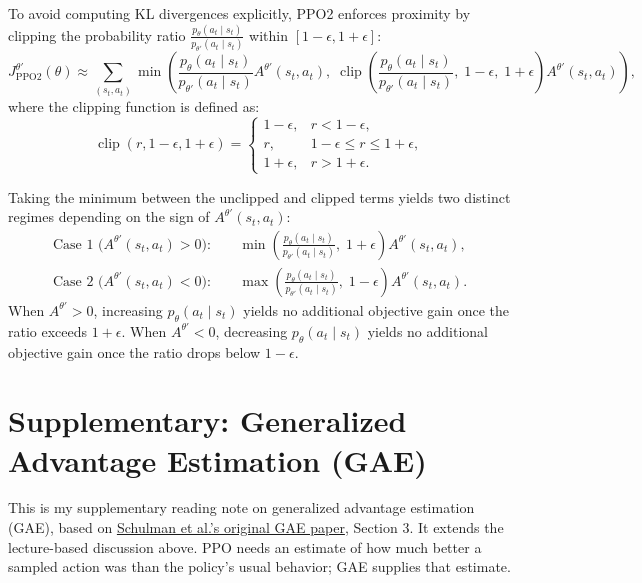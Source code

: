 \documentclass[11pt, a4paper]{article}
\begin{document}
To avoid computing KL divergences explicitly, PPO2 enforces proximity by clipping the probability ratio $\frac{p_\theta(a_t \mid s_t)}{p_{\theta'}(a_t \mid s_t)}$ within $[1 - \epsilon, 1 + \epsilon]$:
\begin{equation}\label{eq:ppo-clipped-objective}
    J_{\text{PPO2}}^{\theta'}(\theta) \approx \sum_{(s_t, a_t)} \min\left( \frac{p_\theta(a_t \mid s_t)}{p_{\theta'}(a_t \mid s_t)} A^{\theta'}(s_t, a_t),\; \operatorname{clip}\left(\frac{p_\theta(a_t \mid s_t)}{p_{\theta'}(a_t \mid s_t)},\; 1 - \epsilon,\; 1 + \epsilon\right) A^{\theta'}(s_t, a_t) \right),
\end{equation}
where the clipping function is defined as:
\begin{equation}\label{eq:ppo-clipping-function}
    \operatorname{clip}(r, 1 - \epsilon, 1 + \epsilon) = \begin{cases}
        1 - \epsilon, & r < 1 - \epsilon, \\
        r, & 1 - \epsilon \le r \le 1 + \epsilon, \\
        1 + \epsilon, & r > 1 + \epsilon.
    \end{cases}
\end{equation}

Taking the minimum between the unclipped and clipped terms yields two distinct regimes depending on the sign of $A^{\theta'}(s_t, a_t)$:
\begin{align}
    \text{Case 1 } \big(A^{\theta'}(s_t, a_t) > 0\big): \quad & \min\left(\frac{p_\theta(a_t \mid s_t)}{p_{\theta'}(a_t \mid s_t)},\; 1 + \epsilon\right) A^{\theta'}(s_t, a_t),\label{eq:ppo-positive-advantage} \\
    \text{Case 2 } \big(A^{\theta'}(s_t, a_t) < 0\big): \quad & \max\left(\frac{p_\theta(a_t \mid s_t)}{p_{\theta'}(a_t \mid s_t)},\; 1 - \epsilon\right) A^{\theta'}(s_t, a_t).\label{eq:ppo-negative-advantage}
\end{align}
When $A^{\theta'} > 0$, increasing $p_\theta(a_t \mid s_t)$ yields no additional objective gain once the ratio exceeds $1 + \epsilon$. When $A^{\theta'} < 0$, decreasing $p_\theta(a_t \mid s_t)$ yields no additional objective gain once the ratio drops below $1 - \epsilon$.

\section{Supplementary: Generalized Advantage Estimation (GAE)}

This is my supplementary reading note on generalized advantage estimation (GAE), based on \href{https://arxiv.org/abs/1506.02438}{Schulman et al.'s original GAE paper}, Section 3. It extends the lecture-based discussion above. PPO needs an estimate of how much better a sampled action was than the policy's usual behavior; GAE supplies that estimate.
\end{document}
